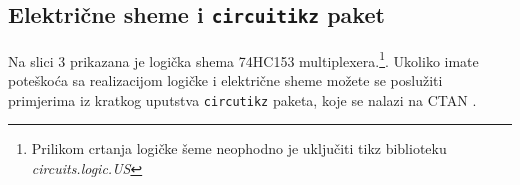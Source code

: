 \documentclass[letter paper]{article}
\begin{document}
\newpage


\subsection{Električne sheme i \texttt{\color{red}circuitikz} paket}
Na slici 3 prikazana je logička shema 74HC153 multiplexera.\footnote{Prilikom crtanja logičke šeme neophodno je uključiti tikz biblioteku \textit{circuits.logic.US}}. Ukoliko imate poteškoća sa realizacijom logičke i električne sheme možete se poslužiti primjerima iz kratkog uputstva \texttt{circutikz} paketa, koje se nalazi na CTAN \href{http://texdoc.net/show.php?pkg=circuitikz}{\color{cyan}{stranici}}.

\begin{figure}[ht!]
\begin{tikzpicture}[circuit logic US, every circuit symbol/.style={thick}]


\end{tikzpicture}
\end{figure}
\end{document}
